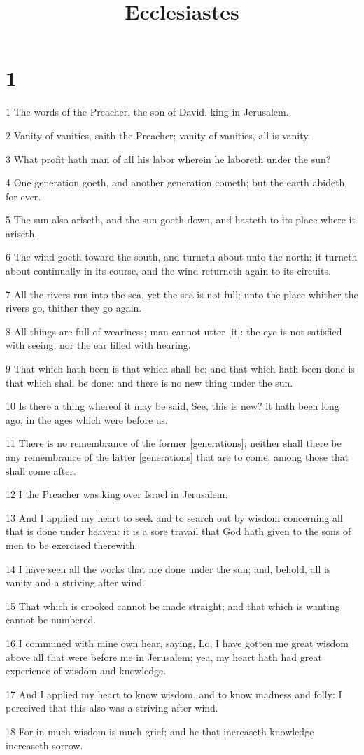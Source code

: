 

\title{Ecclesiastes}

\chapter{1}

\par 1 The words of the Preacher, the son of David, king in Jerusalem.
\par 2 Vanity of vanities, saith the Preacher; vanity of vanities, all is vanity.
\par 3 What profit hath man of all his labor wherein he laboreth under the sun?
\par 4 One generation goeth, and another generation cometh; but the earth abideth for ever.
\par 5 The sun also ariseth, and the sun goeth down, and hasteth to its place where it ariseth.
\par 6 The wind goeth toward the south, and turneth about unto the north; it turneth about continually in its course, and the wind returneth again to its circuits.
\par 7 All the rivers run into the sea, yet the sea is not full; unto the place whither the rivers go, thither they go again.
\par 8 All things are full of weariness; man cannot utter [it]: the eye is not satisfied with seeing, nor the ear filled with hearing.
\par 9 That which hath been is that which shall be; and that which hath been done is that which shall be done: and there is no new thing under the sun.
\par 10 Is there a thing whereof it may be said, See, this is new? it hath been long ago, in the ages which were before us.
\par 11 There is no remembrance of the former [generations]; neither shall there be any remembrance of the latter [generations] that are to come, among those that shall come after.
\par 12 I the Preacher was king over Israel in Jerusalem.
\par 13 And I applied my heart to seek and to search out by wisdom concerning all that is done under heaven: it is a sore travail that God hath given to the sons of men to be exercised therewith.
\par 14 I have seen all the works that are done under the sun; and, behold, all is vanity and a striving after wind.
\par 15 That which is crooked cannot be made straight; and that which is wanting cannot be numbered.
\par 16 I communed with mine own hear, saying, Lo, I have gotten me great wisdom above all that were before me in Jerusalem; yea, my heart hath had great experience of wisdom and knowledge.
\par 17 And I applied my heart to know wisdom, and to know madness and folly: I perceived that this also was a striving after wind.
\par 18 For in much wisdom is much grief; and he that increaseth knowledge increaseth sorrow.

